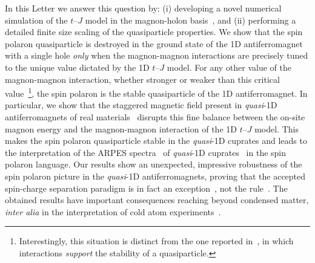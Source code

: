 \documentclass[%
 reprint,
 amsmath,amssymb,
 aps,
prl,
]{revtex4-1}
\begin{document}
In this Letter we answer this question by: (i) developing a novel numerical simulation of the $t$--$J$ model in the magnon-holon basis~\cite{Mar91}, and (ii) performing a detailed finite size scaling of the quasiparticle properties. We show that the spin polaron quasiparticle is destroyed in the ground state of the 1D antiferromagnet with a single hole {\it only} when the magnon-magnon interactions are precisely tuned to the unique value dictated by the 1D $t$--$J$ model. 
For any other value of the magnon-magnon interaction, whether stronger or weaker than this critical value~\footnote{Interestingly, this situation is distinct from the one reported in~\cite{Ver19}, in which interactions {\it support} the stability of a quasiparticle.}, the spin polaron is the stable quasiparticle of the 1D antiferromagnet. 
In particular, we show that the staggered magnetic field present in {\it quasi}-1D antiferromagnets of real materials~\cite{Kojima1997, Matsuda1997, Lake2005}
disrupts this fine balance between the on-site magnon energy and the magnon-magnon interaction of the 1D $t$--$J$ model.
This makes the spin polaron quasiparticle stable in the {\it quasi}-1D cuprates and leads to the interpretation of the ARPES spectra~\cite{Sobota2021} 
of {\it quasi}-1D cuprates~\cite{Kim96, Kim1997, Fujisawa1999, Koitzsch2006, Kim06} in the spin polaron language. Our results show an unexpected, impressive robustness of the spin polaron picture in the {\it quasi}-1D antiferromagnets, proving that the accepted spin-charge separation paradigm is in fact an exception~\cite{Bonca1992, Greiter2002,  Schmidt2003, Smakov2007, Lake2010, Yang2022}, not the rule~\cite{Giamarchi2003}. The obtained results have important consequences reaching beyond condensed matter, {\it inter alia} in the interpretation of cold atom experiments~\cite{Bohrdt2021, Koepsell2021}.
\end{document}
